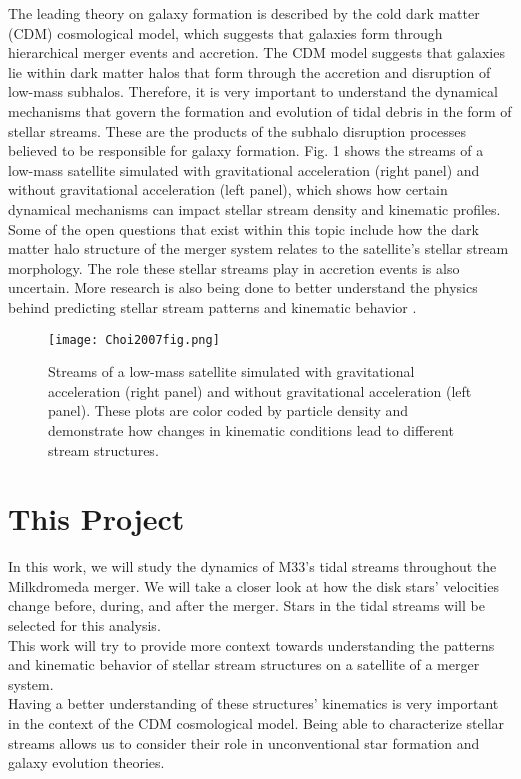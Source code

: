 \documentclass[preprint2]{aastex7}
\begin{document}
The leading theory on galaxy formation is described by the cold dark matter (CDM) cosmological model, which suggests that galaxies form through hierarchical merger events and accretion. The CDM model suggests that galaxies lie within dark matter halos that form through the accretion and disruption of low-mass subhalos. Therefore, it is very important to understand the dynamical mechanisms that govern the formation and evolution of tidal debris in the form of stellar streams. These are the products of the subhalo disruption processes believed to be responsible for galaxy formation\citep{Shipp_2023}. Fig. 1 shows the streams of a low-mass satellite simulated with gravitational acceleration (right panel) and without gravitational acceleration (left panel), which shows how certain dynamical mechanisms can impact stellar stream density and kinematic profiles.\\
Some of the open questions that exist within this topic include how the dark matter halo structure of the merger system relates to the satellite's stellar stream morphology. The role these stellar streams play in accretion events is also uncertain\citep{10.1093/mnras/sty2474}. More research is also being done to better understand the physics behind predicting stellar stream patterns and kinematic behavior \citep{Reshetnikov_2001}. \\
\begin{figure}[h]
\centering
    \texttt{[image: Choi2007fig.png]}
    \label{fig:enter-label}
    \caption{Streams of a low-mass satellite simulated with gravitational acceleration (right panel) and without gravitational acceleration (left panel)\citep{10.1111/j.1365-2966.2007.12313.x}. These plots are color coded by particle density and demonstrate how changes in kinematic conditions lead to different stream structures.}
\end{figure}
\section{This Project}
In this work, we will study the dynamics of M33's tidal streams throughout the Milkdromeda merger. We will take a closer look at how the disk stars' velocities change before, during, and after the merger. Stars in the tidal streams will be selected for this analysis.\\
This work will try to provide more context towards understanding the patterns and kinematic behavior of stellar stream structures on a satellite of a merger system.\\
Having a better understanding of these structures' kinematics is very important in the context of the CDM cosmological model. Being able to characterize stellar streams allows us to consider their role in unconventional star formation and galaxy evolution theories. 
\end{document}
